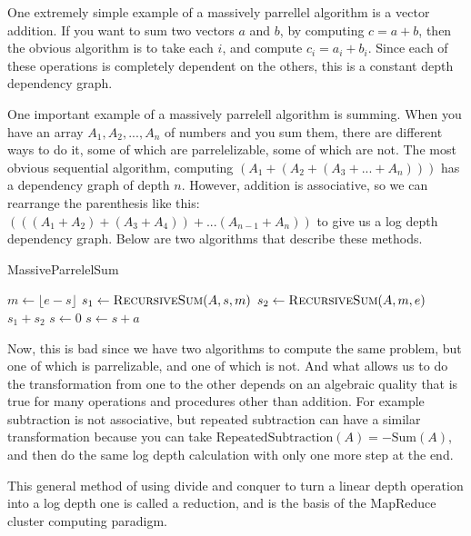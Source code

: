 \documentclass[12pt,twoside]{reedthesis}
\newcommand{\floor}[1]{\lfloor #1 \rfloor}
\begin{document}
		One extremely simple example of a massively parrellel algorithm is a vector addition. If you want to sum two vectors $a$ and $b$, by computing $c = a+b$, then the obvious algorithm is to take each $i$, and compute $c_i = a_i + b_i$. Since each of these operations is completely dependent on the others, this is a constant depth dependency graph. 
		
		One important example of a massively parrelell algorithm is summing. When you have an array $A_1,A_2,...,A_n$ of numbers and you sum them, there are different ways to do it, some of which are parrelelizable, some of which are not. The most obvious sequential algorithm, computing $(A_1+(A_2+(A_3+...+A_n)))$ has a dependency graph of depth $n$. However, addition is associative, so we can rearrange the parenthesis like this: $(((A_1+A_2)+(A_3+A_4))+...(A_{n-1}+A_n))$ to give us a log depth dependency graph. Below are two algorithms that describe these methods.
		
		\begin{algorithm}
			\caption{MassiveParrelelSum}\label{parellelsum}
			\begin{algorithmic}[1]
					\EndIf
					\State $m \gets \floor{e-s}$
					\State $s_1 \gets \textsc{RecursiveSum}(A,s,m)$
					\State $s_2 \gets \textsc{RecursiveSum}(A,m,e)$
					\State \Return $s_1+s_2$
				\EndFunction
					\State $s \gets 0$
						\State $s \gets s + a$
					\EndFor
				\EndFunction
			\end{algorithmic}
		\end{algorithm}
		
		Now, this is bad since we have two algorithms to compute the same problem, but one of which is parrelizable, and one of which is not. And what allows us to do the transformation from one to the other depends on an algebraic quality that is true for many operations and procedures other than addition. For example subtraction is not associative, but repeated subtraction can have a similar transformation because you can take $\text{RepeatedSubtraction}(A) = -\text{Sum}(A)$, and then do the same log depth calculation with only one more step at the end. 
		
		This general method of using divide and conquer to turn a linear depth operation into a log depth one is called a reduction, and is the basis of the MapReduce cluster computing paradigm. 
		
\end{document}
